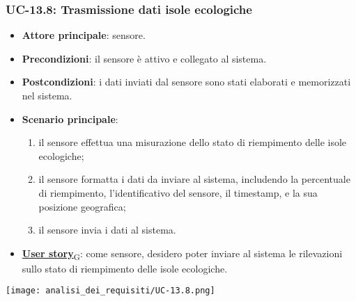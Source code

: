 \subsubsection{UC-13.8: Trasmissione dati isole ecologiche}
\begin{itemize}
	\item \textbf{Attore principale}: sensore.
	\item \textbf{Precondizioni}: il sensore è attivo e collegato al sistema.
	\item \textbf{Postcondizioni}: i dati inviati dal sensore sono stati elaborati e memorizzati nel sistema.
	\item \textbf{Scenario principale}:
	      \begin{enumerate}
		      \item il sensore effettua una misurazione dello stato di riempimento delle isole ecologiche;
		      \item il sensore formatta i dati da inviare al sistema, includendo la percentuale di riempimento, l'identificativo del sensore,
		            il timestamp, e la sua posizione geografica;
		      \item il sensore invia i dati al sistema.
	      \end{enumerate}
	\item \href{https://7last.github.io/docs/rtb/documentazione-interna/glossario\#user-story}{\textbf{User story}\textsubscript{G}}: come sensore, desidero poter inviare al sistema le rilevazioni sullo stato di riempimento delle isole ecologiche.
\end{itemize}

\begin{center}
	\texttt{[image: analisi\_dei\_requisiti/UC-13.8.png]}
\end{center}


